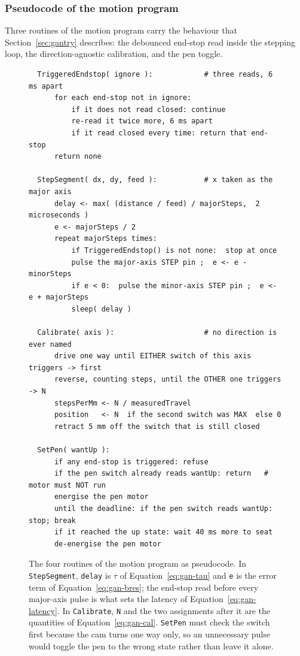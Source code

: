 \subsubsection{Pseudocode of the motion program}

Three routines of the motion program carry the behaviour that Section~\ref{sec:gantry} describes: the debounced end-stop read inside the stepping loop, the direction-agnostic calibration, and the pen toggle.

\begin{figure}[!htbp]
\centering
\fontsize{8.5}{10.2}\selectfont
\begin{verbatim}
  TriggeredEndstop( ignore ):            # three reads, 6 ms apart
      for each end-stop not in ignore:
          if it does not read closed: continue
          re-read it twice more, 6 ms apart
          if it read closed every time: return that end-stop
      return none

  StepSegment( dx, dy, feed ):           # x taken as the major axis
      delay <- max( (distance / feed) / majorSteps,  2 microseconds )
      e <- majorSteps / 2
      repeat majorSteps times:
          if TriggeredEndstop() is not none:  stop at once
          pulse the major-axis STEP pin ;  e <- e - minorSteps
          if e < 0:  pulse the minor-axis STEP pin ;  e <- e + majorSteps
          sleep( delay )

  Calibrate( axis ):                     # no direction is ever named
      drive one way until EITHER switch of this axis triggers -> first
      reverse, counting steps, until the OTHER one triggers    -> N
      stepsPerMm <- N / measuredTravel
      position   <- N  if the second switch was MAX  else 0
      retract 5 mm off the switch that is still closed

  SetPen( wantUp ):
      if any end-stop is triggered: refuse
      if the pen switch already reads wantUp: return   # motor must NOT run
      energise the pen motor
      until the deadline: if the pen switch reads wantUp: stop; break
      if it reached the up state: wait 40 ms more to seat
      de-energise the pen motor
\end{verbatim}
\caption{The four routines of the motion program as pseudocode. In \texttt{StepSegment}, \texttt{delay} is $\tau$ of Equation~\ref{eq:gan-tau} and \texttt{e} is the error term of Equation~\ref{eq:gan-bres}; the end-stop read before every major-axis pulse is what sets the latency of Equation~\ref{eq:gan-latency}. In \texttt{Calibrate}, \texttt{N} and the two assignments after it are the quantities of Equation~\ref{eq:gan-cal}. \texttt{SetPen} must check the switch first because the cam turns one way only, so an unnecessary pulse would toggle the pen to the wrong state rather than leave it alone.}
\label{fig:gan-code}
\end{figure}
